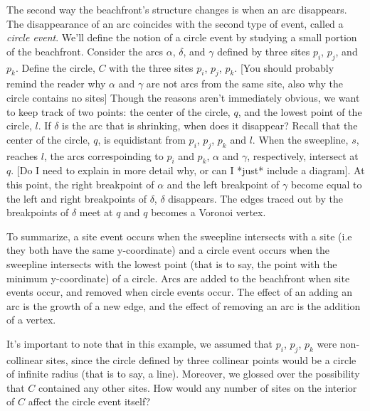 \documentclass[12pt,twoside]{reedthesis}
\begin{document}
    The second way the beachfront's structure changes is when an arc disappears. The disappearance of an arc coincides with the second type of event, called a \emph{circle event}. We'll define the notion of a circle event by studying a small portion of the beachfront. Consider the arcs $\alpha$, $\delta$, and $\gamma$ defined by three sites $p_{i}$, $p_{j}$, and $p_{k}$. Define the circle, $C$ with the three sites $p_{i}$, $p_{j}$, $p_{k}$. [You should probably remind the reader why $\alpha$ and $\gamma$ are not arcs from the same site, also why the circle contains no sites] Though the reasons aren't immediately obvious, we want to keep track of two points: the center of the circle, $q$, and the lowest point of the circle, $l$. If $\delta$ is the arc that is shrinking, when does it disappear? Recall that the center of the circle, $q$, is equidistant from $p_{i}$, $p_{j}$, $p_{k}$ and $l$. When the sweepline, $s$, reaches $l$, the arcs correspoinding to $p_{i}$ and $p_{k}$, $\alpha$ and $\gamma$, respectively, intersect at $q$. [Do I need to explain in more detail why, or can I *just* include a diagram]. At this point, the right breakpoint of $\alpha$ and the left breakpoint of $\gamma$ become equal to the left and right breakpoints of $\delta$, $\delta$ disappears. The edges traced out by the breakpoints of $\delta$ meet at $q$ and $q$ becomes a Voronoi vertex.\par
    To summarize, a site event occurs when the sweepline intersects with a site (i.e they both have the same y-coordinate) and a circle event occurs when the sweepline intersects with the lowest point (that is to say, the point with the minimum y-coordinate) of a circle. Arcs are added to the beachfront when site events occur, and removed when circle events occur. The effect of an adding an arc is the growth of a new edge, and the effect of removing an arc is the addition of a vertex.\par
    It's important to note that in this example, we assumed that $p_{i}$, $p_{j}$, $p_{k}$ were non-collinear sites, since the circle defined by three collinear points would be a circle of infinite radius (that is to say, a line). Moreover, we glossed over the possibility that $C$ contained any other sites. How would any number of sites on the interior of $C$ affect the circle event itself? \par 
\end{document}
